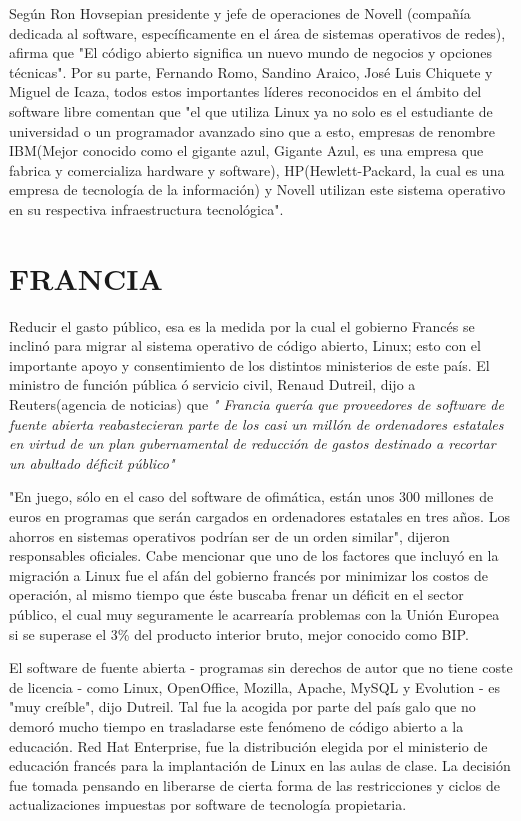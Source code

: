 Según Ron Hovsepian presidente y jefe de operaciones de Novell (compañía dedicada al software, específicamente en el área de sistemas operativos de redes), afirma que "El código 
abierto significa un nuevo mundo de negocios y opciones técnicas". Por su parte, Fernando Romo, Sandino Araico, José Luis Chiquete y Miguel de Icaza, todos estos importantes 
líderes reconocidos en el ámbito del software libre comentan que "el que utiliza Linux ya no solo es el estudiante de universidad o un programador avanzado sino que a esto, 
empresas de renombre IBM(Mejor conocido como el gigante azul, Gigante Azul, es una empresa que fabrica y comercializa hardware y software), HP(Hewlett-Packard, la cual es una 
empresa de tecnología de la información) y Novell utilizan este sistema operativo en su respectiva infraestructura tecnológica".


\section*{FRANCIA}
Reducir el gasto público, esa es la medida por la cual el gobierno Francés se inclinó para migrar al sistema operativo de código abierto, Linux; esto con el importante apoyo y 
consentimiento de los distintos ministerios de este país. El ministro de función pública ó servicio civil, Renaud Dutreil, dijo a Reuters(agencia de noticias) que 
\textit{" Francia quería que proveedores de software de fuente abierta reabastecieran parte de los casi un millón de ordenadores estatales en virtud de un plan gubernamental de 
reducción de gastos destinado a recortar un abultado déficit público"}

"En juego, sólo en el caso del software de ofimática, están unos 300 millones de euros en programas que serán cargados en ordenadores estatales en tres años. Los ahorros en 
sistemas operativos podrían ser de un orden similar", dijeron responsables oficiales. Cabe mencionar que uno de los factores que incluyó en la migración a Linux fue el afán del 
gobierno francés por minimizar los costos de operación, al mismo tiempo que éste buscaba frenar un déficit en el sector público, el cual muy seguramente le acarrearía problemas 
con la Unión Europea si se superase el 3\% del producto interior bruto, mejor conocido como BIP.

El software de fuente abierta - programas sin derechos de autor que no tiene coste de licencia - como Linux, OpenOffice, Mozilla, Apache, MySQL y Evolution - es "muy creíble", 
dijo Dutreil. Tal fue la acogida por parte del país galo que no demoró mucho tiempo en trasladarse este fenómeno de código abierto a la educación. Red Hat Enterprise, fue la 
distribución elegida por el ministerio de educación francés para la implantación de Linux en las aulas de clase. La decisión fue tomada pensando en liberarse de cierta forma de 
las restricciones y ciclos de actualizaciones  impuestas por software de tecnología propietaria.


